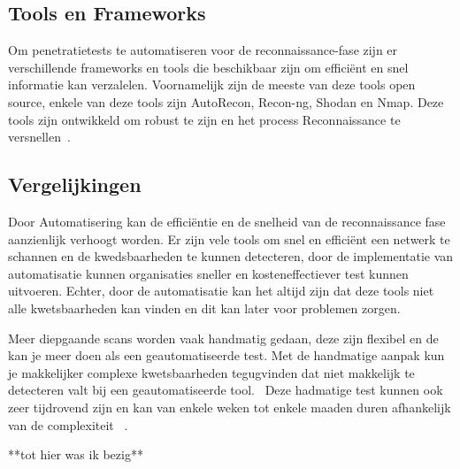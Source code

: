 \subsection{Tools en Frameworks}

Om penetratietests te automatiseren voor de reconnaissance-fase zijn er verschillende frameworks en tools die beschikbaar zijn om 
efficiënt en snel informatie kan verzalelen. Voornamelijk zijn de meeste van deze tools open source, enkele van deze tools zijn 
AutoRecon, Recon-ng, Shodan en Nmap. Deze tools zijn ontwikkeld om robust te zijn en het process Reconnaissance te versnellen~\autocite{Shebli}.


\subsection{Vergelijkingen}

Door Automatisering kan de efficiëntie en de snelheid van de reconnaissance fase aanzienlijk verhoogt worden. Er zijn vele tools om 
snel en efficiënt een netwerk te schannen en de kwedsbaarheden te kunnen detecteren, door de implementatie van automatisatie kunnen 
organisaties sneller en kosteneffectiever test kunnen uitvoeren. Echter, door de automatisatie kan het altijd
zijn dat deze tools niet alle kwetsbaarheden kan vinden en dit kan later voor problemen zorgen.~\autocite{peris2023}

Meer diepgaande scans worden vaak handmatig gedaan, deze zijn flexibel en de kan je meer doen als een geautomatiseerde test. 
Met de handmatige aanpak kun je makkelijker complexe kwetsbaarheden tegugvinden dat niet makkelijk te detecteren valt bij 
een geautomatiseerde tool.~\autocite{techtarget2023} Deze hadmatige test kunnen ook zeer tijdrovend zijn en kan van enkele 
weken tot enkele maaden duren afhankelijk van de complexiteit ~\autocite{Shah}.


**tot hier was ik bezig**






